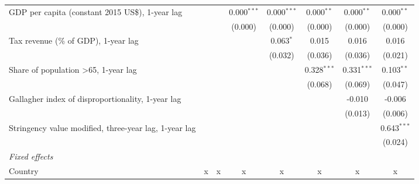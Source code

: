 \begin{tabular}{lccccccc}
   GDP per capita (constant 2015 US\$), 1-year lag                                           &               &              & 0.000$^{***}$ & 0.000$^{***}$ & 0.000$^{**}$  & 0.000$^{**}$  & 0.000$^{**}$\\   
                                                                                             &               &              & (0.000)       & (0.000)       & (0.000)       & (0.000)       & (0.000)\\   
   Tax revenue (\% of GDP), 1-year lag                                                       &               &              &               & 0.063$^{*}$   & 0.015         & 0.016         & 0.016\\   
                                                                                             &               &              &               & (0.032)       & (0.036)       & (0.036)       & (0.021)\\   
   Share of population >65, 1-year lag                                                       &               &              &               &               & 0.328$^{***}$ & 0.331$^{***}$ & 0.103$^{**}$\\   
                                                                                             &               &              &               &               & (0.068)       & (0.069)       & (0.047)\\   
   Gallagher index of disproportionality, 1-year lag                                         &               &              &               &               &               & -0.010        & -0.006\\   
                                                                                             &               &              &               &               &               & (0.013)       & (0.006)\\   
   Stringency value modified, three-year lag, 1-year lag                                     &               &              &               &               &               &               & 0.643$^{***}$\\   
                                                                                             &               &              &               &               &               &               & (0.024)\\   
   \emph{Fixed effects}\\
   Country                                                                                   & x             & x            & x             & x             & x             & x             & x\\  

\end{tabular}
